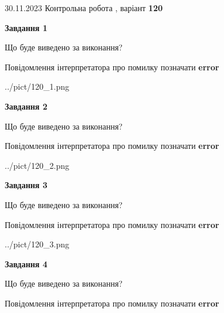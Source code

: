 \documentclass[12pt, ukrainian]{article}
\begin{document}
{{30.11.2023 Контрольна робота , варіант  \No \textbf { 120 }\par}}
{




{\begin {center}\textbf{Завдання 1}\end {center}}\par
Що буде виведено за виконання? \par
Повідомлення інтерпретатора про помилку позначати \textbf{error}

\begin{center}
	{../pict/120_1.png}
\end{center}
\newpage

{\begin {center}\textbf{Завдання 2}\end {center}}\par
Що буде виведено за виконання? \par
Повідомлення інтерпретатора про помилку позначати \textbf{error}

\begin{center}
	{../pict/120_2.png}
\end{center}
\newpage

{\begin {center}\textbf{Завдання 3}\end {center}}\par
Що буде виведено за виконання? \par
Повідомлення інтерпретатора про помилку позначати \textbf{error}

\begin{center}
	{../pict/120_3.png}
\end{center}
\newpage

{\begin {center}\textbf{Завдання 4}\end {center}}\par
Що буде виведено за виконання? \par
Повідомлення інтерпретатора про помилку позначати \textbf{error}

}
\end{document}
